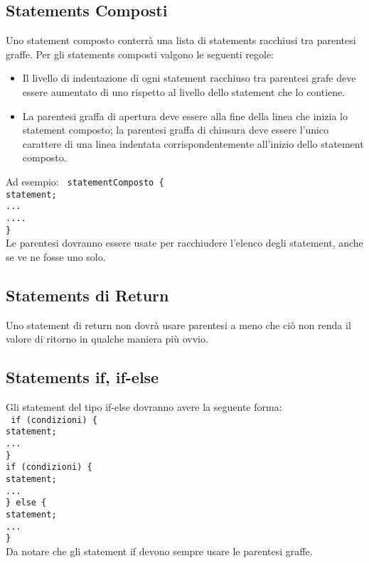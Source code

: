 \subsection{Statements Composti}
Uno statement composto conterr\`a una lista di statements racchiusi tra parentesi graffe. Per gli statements composti valgono le seguenti regole:
\begin{itemize}
\item Il livello di indentazione di ogni statement racchiuso tra parentesi grafe deve essere aumentato di uno rispetto al livello dello statement che lo contiene.
\item La parentesi graffa di apertura deve essere alla fine della linea che inizia lo statement composto; la parentesi graffa di chiusura deve essere l'unico carattere di una linea indentata corrispondentemente all'inizio dello statement composto.\newline
\end{itemize}
Ad esempio:\newline
	\newline
	\texttt{
	statementComposto \{ \\
	\phantom{....}statement;\\
	\phantom{....}... \\
	\phantom{....}.... \\
	\}
} \\
 \newline
Le parentesi dovranno essere usate per racchiudere l'elenco degli statement, anche se ve ne fosse uno solo.
\subsection{Statements di Return}
Uno statement di return non dovr\`a usare parentesi a meno che ci\`o non renda il valore di ritorno in qualche maniera pi\`u ovvio.
\subsection{Statements if, if-else}
Gli statement del tipo if-else dovranno avere la seguente forma:\\
\texttt{
	 \newline
	if (condizioni) \{ \\
	\phantom{....}statement;\\
	\phantom{....}... \\
	\}
	\\
	\newline
	\newline
	if (condizioni) \{ \\
	\phantom{....}statement;\\
	\phantom{....}... \\
	\} else \{\\
	\phantom{....}statement;\\
	\phantom{....}... \\
	\}
	\\
	\newline
}
Da notare che gli statement if devono sempre usare le parentesi graffe.
